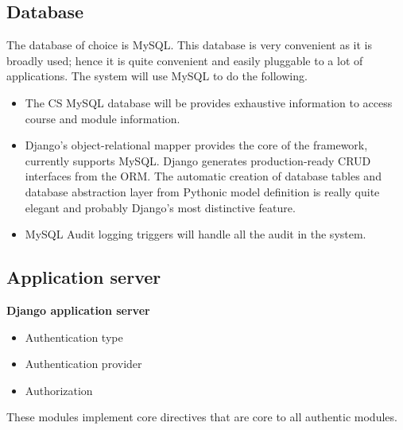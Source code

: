 \documentclass[10pt,a4paper]{article}
\begin{document}
\textbf {\textbf{}}


\subsection{Database}
The database of choice is MySQL. This database is very convenient as it is broadly used; hence it is quite convenient and easily pluggable to a lot of applications. The system will use MySQL to do the following. 
\begin{itemize}
\item The CS MySQL database will be provides exhaustive information to access course and module information.
\item Django's object-relational mapper provides the core of the framework, currently supports MySQL. Django generates production-ready CRUD interfaces from the ORM. The automatic creation of database tables and database abstraction layer from Pythonic model definition is really quite elegant and probably Django's most distinctive feature.
\item MySQL Audit logging triggers will handle all the audit in the system. 
\end{itemize}


\subsection{Application server }
\indent \textbf{Django application server}


\textbf {\textbf{}}
\begin{itemize}
\item Authentication type
\item Authentication provider
\item Authorization
\end{itemize}
These modules implement core directives that are core to all authentic modules.
\end{document}
